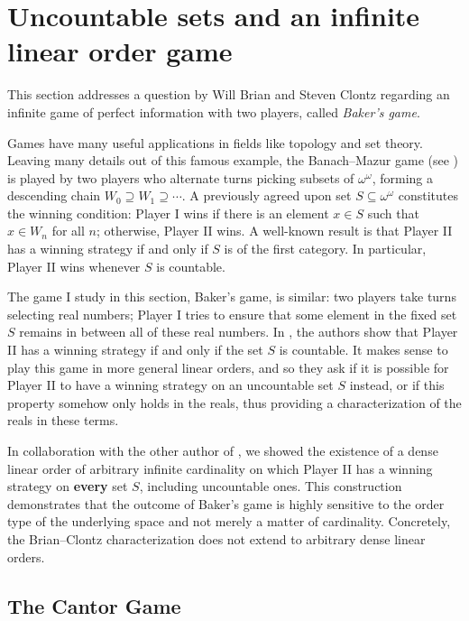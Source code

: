 
\section{Uncountable sets and an infinite linear order game}\label{sec:cantor_game}

This section addresses a question by Will Brian and Steven Clontz regarding an infinite game of perfect information with two players, called \emph{Baker's game}.

Games have many useful applications in fields like topology and set theory.
Leaving many details out of this famous example, the Banach--Mazur game (see \cite{oxtoby1957}) is played by two players who alternate turns picking subsets of $\omega^\omega$, forming a descending chain $W_0\supseteq W_1\supseteq\cdots$.
A previously agreed upon set $S\subseteq\omega^\omega$ constitutes the winning condition:
Player I wins if there is an element $x\in S$ such that $x\in W_n$ for all $n$; otherwise, Player II wins.
A well-known result is that Player II has a winning strategy if and only if $S$ is of the first category.
In particular, Player II wins whenever $S$ is countable.

The game I study in this section, Baker's game, is similar: two players take turns selecting real numbers; Player I tries to ensure that some element in the fixed set $S$ remains in between all of these real numbers.
In \cite{brian-clontz}, the authors show that Player II has a winning strategy if and only if the set $S$ is countable.
It makes sense to play this game in more general linear orders, and so they ask if it is possible for Player II to have a winning strategy on an uncountable set $S$ instead, or if this property somehow only holds in the reals, thus providing a characterization of the reals in these terms.

In collaboration with the other author of \cite{MatosWiederholdSalvetti2025}, we showed the existence of a dense linear order of arbitrary infinite cardinality on which Player II has a winning strategy on \textbf{every} set $S$, including uncountable ones.
This construction demonstrates that the outcome of Baker's game is highly sensitive to the order type of the underlying space and not merely a matter of cardinality.
Concretely, the Brian--Clontz characterization does not extend to arbitrary dense linear orders.

\subsection{The Cantor Game}

